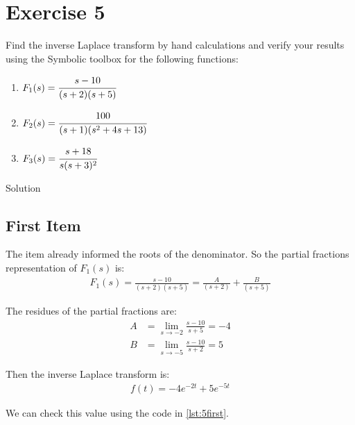 \documentclass[a4paper,11pt]{article}
\begin{document}
\section*{Exercise 5}

\noindent Find the inverse Laplace transform by hand calculations and verify your results using the Symbolic toolbox for the following functions: 
\begin{enumerate}
\item $F_1(s)=\cfrac{s-10}{(s+2)(s+5)}$ 
\item $F_2(s)=\cfrac{100}{(s+1)(s^2+4s+13)}$
\item $F_3(s)=\cfrac{s+18}{s(s+3)^2}$ 
\end{enumerate}

{\large \sc \noindent \sc Solution} 					\\ 

\subsection*{First Item}
\par The item already informed the roots of the denominator. So the partial fractions representation of $F_1(s)$ is:
\begin{align}
F_1(s)=\frac{s-10}{(s+2)(s+5)}=\frac{A}{(s+2)}+\frac{B}{(s+5)}
\end{align}
\par The residues of the partial fractions are:
\begin{align*}
A &= \lim_{s\rightarrow -2} \frac{s-10}{s+5}=-4\\
B &= \lim_{s\rightarrow -5} \frac{s-10}{s+2}=5
\end{align*}
\par Then the inverse Laplace transform is:
\begin{align}
f(t)= -4e^{-2t}+5e^{-5t}
\end{align}
\par We can check this value using the code in \ref{lst:5first}.
\vspace{1mm}
\end{document}
